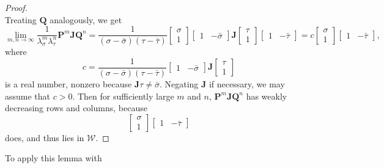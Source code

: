 \documentclass{article}
\numberwithin{equation}{section}
\theoremstyle{definition}
\theoremstyle{remark}
\newcommand{\W}{\mathcal{W}}
\renewcommand{\to}{\mathop{\rightarrow}\limits}
\newcommand{\<}{\left\langle}
\renewcommand{\>}{\right\rangle}
\begin{document}
\begin{proof}
\begin{equation}
  \end{equation}
  Treating $\mathbf{Q}$ analogously, we get
  \begin{equation}
    \lim_{m,n\to \infty} \frac{1}{\lambda_\sigma^m \lambda_\tau^n}  \mathbf{P}^m \mathbf{J} \mathbf{Q}^n = \frac{1}{(\sigma - \bar\sigma)(\tau - \bar\tau)} \begin{bmatrix}
      \sigma \\ 1
    \end{bmatrix} \begin{bmatrix}
      1 & -\bar\sigma
    \end{bmatrix} \mathbf{J} \begin{bmatrix}
      \tau \\ 1
    \end{bmatrix} \begin{bmatrix}
      1 & -\bar\tau
    \end{bmatrix}
    = c \begin{bmatrix}
      \sigma \\ 1
    \end{bmatrix} \begin{bmatrix}
      1 & -\bar\tau
    \end{bmatrix},
  \end{equation}
  where
  \begin{equation*}
    c = \frac{1}{(\sigma - \bar\sigma)(\tau - \bar\tau)}\begin{bmatrix}
      1 & -\bar\sigma
    \end{bmatrix} \mathbf{J} \begin{bmatrix}
      \tau \\ 1
    \end{bmatrix}
  \end{equation*}
  is a real number, nonzero because $\mathbf{J}\tau \neq \bar\sigma$. Negating $\mathbf{J}$ if necessary, we may assume that $c > 0$. Then for sufficiently large $m$ and $n$, $\mathbf{P}^m \mathbf{J} \mathbf{Q}^n$ has weakly decreasing rows and columns, because
  \begin{equation*}
    \begin{bmatrix}
      \sigma \\ 1
    \end{bmatrix} \begin{bmatrix}
      1 & -\bar\tau
    \end{bmatrix}
  \end{equation*}
  does, and thus lies in $\W$.
\end{proof}
To apply this lemma with
\end{document}
